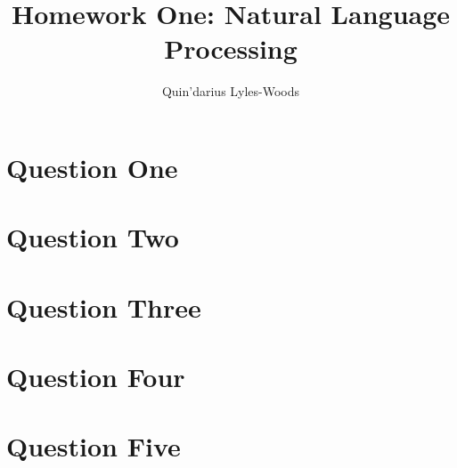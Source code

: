 \documentclass{article}
\title{Homework One: Natural Language Processing}
\author{Quin'darius Lyles-Woods}
\begin{document}
\maketitle
\section{Question One}
\section{Question Two}
\section{Question Three}
\section{Question Four}
\section{Question Five}
\end{document}
